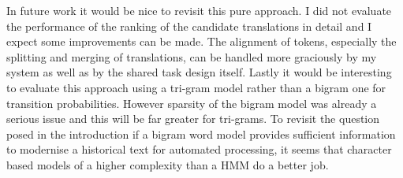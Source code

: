 \documentclass[11pt]{article}
\begin{document}
In future work it would be nice to revisit this pure approach. I did not evaluate the performance of the ranking of the candidate translations in detail and I expect some improvements can be made. The alignment of tokens, especially the splitting and merging of translations, can be handled more graciously by my system as well as by the shared task design itself. Lastly it would be interesting to evaluate this approach using a tri-gram model rather than a bigram one for transition probabilities. However sparsity of the bigram model was already a serious issue and this will be far greater for tri-grams. To revisit the question posed in the introduction if a bigram word model provides sufficient information to modernise a historical text for automated processing, it seems that character based models of a higher complexity than a HMM do a better job.



\end{document}
